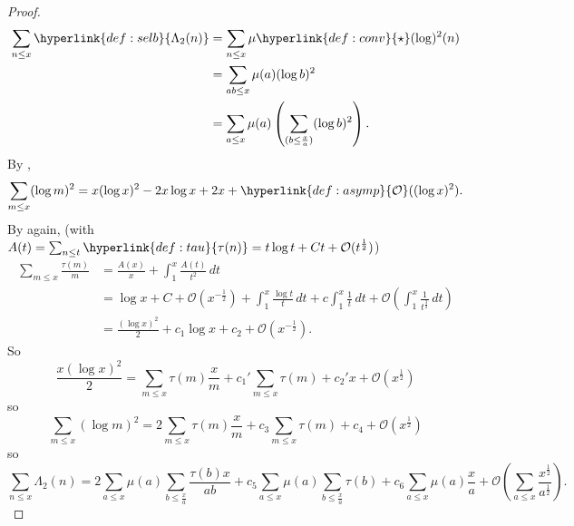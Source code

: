 \documentclass{article}
\newcommand{\bigO}{\mathcal{O}}
\begin{document}
\begin{proof}
  \begin{align*}
    \sum_{n \leq x} \hyperlink{def:selb}{\Lambda_2(n)} &= \sum_{n \leq x} \mu \hyperlink{def:conv}{\star}(\log)^2(n) \\
                                 &= \sum_{ab \leq x} \mu(a) (\log b)^2 \\
                                 &= \sum_{a \leq x} \mu(a) \left(\sum_{(b \leq \frac x a)} (\log b)^2\right).
  \end{align*}
  By ,
  \begin{equation*}
    \sum_{m \leq x} (\log m)^2 = x (\log x)^2 - 2 x \log x + 2 x + \hyperlink{def:asymp}{\bigO}((\log x)^2).
  \end{equation*}
  By  again, (with $A(t) = \sum_{n \leq t} \hyperlink{def:tau}{\tau(n)} = t \log t + Ct + \bigO(t^{\frac 12})$)
  \begin{align*}
    \sum_{m \leq x} \frac{\tau(m)}{m} &= \frac{A(x)}{x} + \int_1^x \frac{A(t)}{t^2} \, dt \\
                                      &= \log x + C + \bigO(x^{-\frac 12}) + \int_1^x \frac{\log t}{t} \, dt + c \int_1^x \frac 1t \, dt + \bigO\left(\int_1^x \frac{1}{t^{\frac{3}{2}}} \, dt\right) \\
                                      &= \frac{(\log x)^2}{2} + c_1 \log x + c_2 + \bigO(x^{-\frac{1}{2}}).
  \end{align*}
  So
  \begin{equation*}
    \frac{x (\log x)^2}{2} = \sum_{m \leq x} \tau(m) \frac{x}{m} + c_1' \sum_{m \leq x} \tau(m) + c_2'x + \bigO(x^{\frac{1}{2}})
  \end{equation*}
  so
  \begin{equation*}
    \sum_{m \leq x} (\log m)^2 = 2 \sum_{m \leq x} \tau(m) \frac{x}{m} + c_3 \sum_{m \leq x} \tau(m) + c_4 + \bigO(x^{\frac{1}{2}})
  \end{equation*}
  so
  \begin{equation*}
    \sum_{n \leq x} \Lambda_2(n) = 2 \sum_{a \leq x} \mu(a) \sum_{b \leq \frac xa} \frac{\tau(b) x}{ab} + c_5 \sum_{a \leq x} \mu(a) \sum_{b \leq \frac xa} \tau(b) + c_6 \sum_{a \leq x} \mu(a) \frac xa + \bigO\left(\sum_{a \leq x} \frac{x^{\frac 12}}{a^{\frac 12}}\right).
  \end{equation*}


\end{proof}
\end{document}
